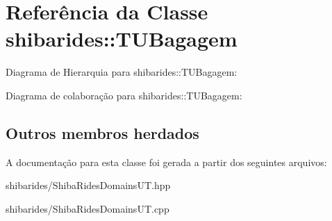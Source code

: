 \hypertarget{classshibarides_1_1TUBagagem}{}\section{Referência da Classe shibarides\+:\+:T\+U\+Bagagem}
\label{classshibarides_1_1TUBagagem}


Diagrama de Hierarquia para shibarides\+:\+:T\+U\+Bagagem\+:


Diagrama de colaboração para shibarides\+:\+:T\+U\+Bagagem\+:
\subsection*{Outros membros herdados}


A documentação para esta classe foi gerada a partir dos seguintes arquivos\+:\begin{DoxyCompactItemize}
\item 
shibarides/Shiba\+Rides\+Domains\+U\+T.\+hpp\item 
shibarides/Shiba\+Rides\+Domains\+U\+T.\+cpp\end{DoxyCompactItemize}
